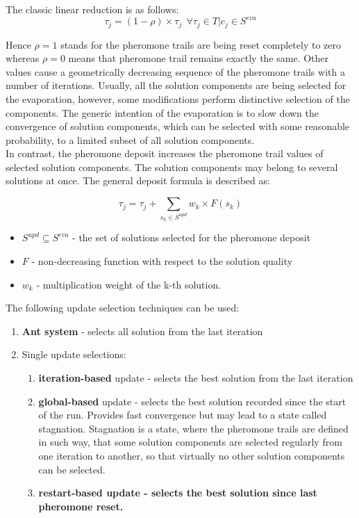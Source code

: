 \documentclass[12pt,a4paper,oneside]{book}
\begin{document}
The classic linear reduction is as follows:
\begin{equation}
\tau_j = (1-\rho) \times \tau_j \ \ \forall  \tau_j \in T | c_j \in S^{eva}
\end{equation}

Hence $\rho=1$ stands for the pheromone trails are being reset completely to zero whereas $\rho=0$ means that pheromone trail remains exactly the same. Other values cause a geometrically decreasing sequence of the pheromone trails with a number of iterations. Usually, all the solution components are being selected for the evaporation, however, some modifications perform distinctive selection of the components. The generic intention of the evaporation is to slow down the convergence of solution components, which can be selected with some reasonable probability, to a limited subset of all solution components. \\

In contrast, the pheromone deposit increases the pheromone trail values of selected solution components. The solution components may belong to several solutions at once. The general deposit formula is described as:

\begin{equation}
\tau_j = \tau_j + \sum \limits_{s_k \in S^{upd}} w_k \times F(s_k)
\end{equation} 

\begin{itemize}
\item $S^{upd} \subseteq S^{eva}$ - the set of solutions selected for the pheromone deposit
\item $F$ - non-decreasing function with respect to the solution quality
\item $w_k$ - multiplication weight of the k-th solution.  
\end{itemize}

The following update selection techniques can be used:
\begin{enumerate}
\item {\textbf{Ant system} - selects all solution from the last iteration}
\item {Single update selections:}
\begin{enumerate}
\item {\textbf{iteration-based} update - selects the best solution from the last iteration}
\item {\textbf{global-based} update - selects the best solution recorded since the start of the run. Provides fast convergence but may lead to a state called stagnation. Stagnation is a state, where the pheromone trails are defined in such way, that some solution components are selected regularly from one iteration to another, so that virtually no other solution components can be selected.}
\item \textbf{{restart-based} update - selects the best solution since last pheromone reset.}
\end{enumerate}
\end{enumerate}
\end{document}
